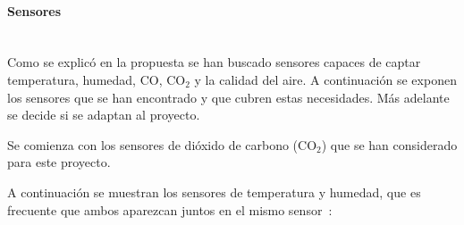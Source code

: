 \paragraph{Sensores}\mbox{} \\
Como se explicó en la propuesta se han buscado sensores capaces de captar temperatura, humedad, CO, CO$_2$ y la calidad del aire. A continuación se exponen los sensores que se han encontrado y que cubren estas necesidades. Más adelante se decide si se adaptan al proyecto.

Se comienza con los sensores de dióxido de carbono (CO$_2$) que se han considerado para este proyecto.

\begin{table}[H]
	\centering
	\caption{Comparación sensores CO$_2$}
	\label{tab:comp_co2}
\end{table}

A continuación se muestran los sensores de temperatura y humedad, que es frecuente que ambos aparezcan juntos en el mismo sensor~\cite{randomnerdtutorials_comparing_2019}:

